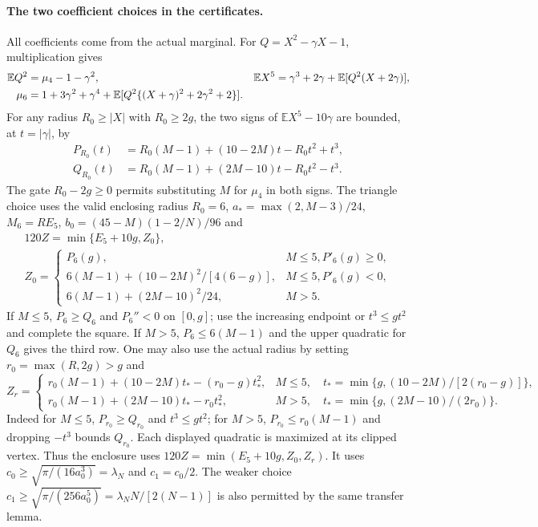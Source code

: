 \documentclass[11pt,a4paper]{article}
\numberwithin{equation}{section}
\theoremstyle{definition}
\theoremstyle{remark}
\newcommand{\E}{\mathbb E}
\begin{document}
\paragraph{The two coefficient choices in the certificates.}
All coefficients come from the actual marginal. For $Q=X^2-\gamma X-1$,
multiplication gives
\begin{align}\label{cut49:fourier:pearson}
 \E Q^2&=\mu_4-1-\gamma^2,&
 \E X^5&=\gamma^3+2\gamma+\E[Q^2(X+2\gamma)],\notag\\
 \mu_6&=1+3\gamma^2+\gamma^4+
       \E[Q^2\{(X+\gamma)^2+2\gamma^2+2\}].
\end{align}
For any radius $R_0\ge|X|$ with $R_0\ge2g$, the two signs of
$\E X^5-10\gamma$ are bounded, at $t=|\gamma|$, by
\begin{align*}
 P_{R_0}(t)&=R_0(M-1)+(10-2M)t-R_0t^2+t^3,\\
 Q_{R_0}(t)&=R_0(M-1)+(2M-10)t-R_0t^2-t^3.
\end{align*}
The gate $R_0-2g\ge0$ permits substituting $M$ for $\mu_4$ in both
signs. The triangle choice uses the valid enclosing radius $R_0=6$, $a_* =\max(2,M-3)/24$,
$M_6=RE_5$, $b_0=(45-M)(1-2/N)/96$ and
\begin{equation}\label{cut49:fourier:z0}
\begin{gathered}
 120Z=\min\{E_5+10g,Z_0\},\\
 Z_0=\begin{cases}
 P_6(g),&M\le5, P'_6(g)\ge0,\\
 6(M-1)+(10-2M)^2/[4(6-g)],&M\le5, P'_6(g)<0,\\
 6(M-1)+(2M-10)^2/24,&M>5.
 \end{cases}
\end{gathered}
\end{equation}
If $M\le5$, $P_6\ge Q_6$ and $P_6''<0$ on $[0,g]$; use the
increasing endpoint or $t^3\le gt^2$ and complete the square.
If $M>5$, $P_6\le6(M-1)$ and the upper quadratic for $Q_6$ gives
the third row. One may also use the actual radius by setting
$r_0=\max(R,2g)>g$ and
\[
 Z_r=\begin{cases}
 r_0(M-1)+(10-2M)t_*-(r_0-g)t_*^2,
 & M\le5,\quad t_*=\min\{g,(10-2M)/[2(r_0-g)]\},\\
 r_0(M-1)+(2M-10)t_*-r_0t_*^2,
 & M>5,\quad t_*=\min\{g,(2M-10)/(2r_0)\}.
 \end{cases}
\]
Indeed for $M\le5$, $P_{r_0}\ge Q_{r_0}$ and $t^3\le gt^2$;
for $M>5$, $P_{r_0}\le r_0(M-1)$ and dropping $-t^3$ bounds
$Q_{r_0}$. Each displayed quadratic is maximized at its clipped vertex.
Thus the enclosure uses
$120Z=\min(E_5+10g,Z_0,Z_r)$.
It uses $c_0\ge\sqrt{\pi/(16a_0^3)}=\lambda_N$ and $c_1=c_0/2$.
The weaker choice $c_1\ge\sqrt{\pi/(256a_0^5)}
=\lambda_N N/[2(N-1)]$ is also permitted by the same transfer lemma.
\end{document}
